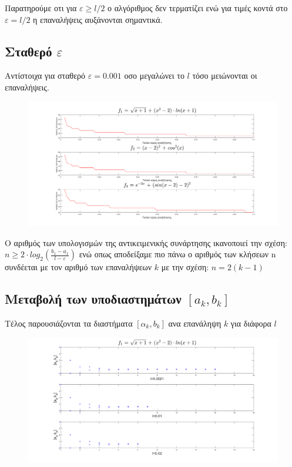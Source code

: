 \documentclass{article}
\begin{document}
 Παρατηρούμε οτι για $\boxed{ε\geq l/2}$ ο αλγόριθμος δεν τερματίζει ενώ για τιμές κοντά στο $\boxed{ε=l/2}$ η επαναλήψεις αυξάνονται σημαντικά. 
\newpage
\subsection*{Σταθερό $ε$}
Αντίστοιχα για σταθερό $\boxed{ε=0.001}$ οσο μεγαλώνει το $l$ τόσο μειώνονται οι επαναλήψεις.
\begin{figure}[h!]	
     \centering
     \advance\leftskip-2.9cm  
  \includegraphics[width=180mm,scale=2]{thema1b.png}
\end{figure}

O αριθμός των υπολογισμών της αντικειμενικής συνάρτησης ικανοποιεί την σχέση: $\boxed{n \geq 2 \cdot log_2(\frac{b_1-a_1}{l-ε})}$ ενώ οπως αποδείξαμε πιο πάνω ο αριθμός των κλήσεων n συνδέεται με τον αριθμό των επαναλήψεων $k$ με την σχέση: $\boxed{n = 2(k-1)}$
\newpage
\subsection*{Μεταβολή των υποδιαστημάτων $[a_k,b_k]$}
Tέλος παρουσιάζονται τα διαστήματα $[α_k,b_k]$ ανα επανάληψη $k$ για διάφορα $l$  
\begin{figure}[h!]	
     \centering
     \advance\leftskip-2.45cm 
  \includegraphics[width=160mm,scale=2]{t3a.png}
\end{figure}
\end{document}
